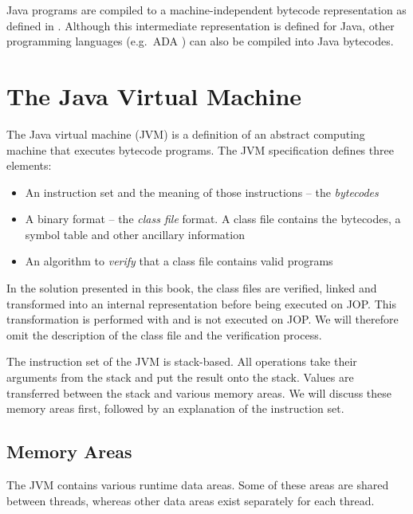 Java programs are compiled to a machine-independent bytecode
representation as defined in \cite{jvm}. Although this intermediate
representation is defined for Java, other programming languages
(e.g.\ ADA \cite{269646}) can also be compiled into Java bytecodes.

\section{The Java Virtual Machine}

The Java virtual machine (JVM) is a definition of an abstract
computing machine that executes bytecode programs. The JVM
specification \cite{jvm} defines three elements:
\begin{itemize}
    \item An instruction set and the meaning of those instructions
    -- the \emph{bytecodes}
    \item A binary format -- the \emph{class file} format. A
    class file contains the bytecodes, a symbol table and other
    ancillary information
    \item An algorithm to \emph{verify} that a class file
    contains valid programs
\end{itemize}
%
In the solution presented in this book, the class files are
verified, linked and transformed into an internal representation
before being executed on JOP. This transformation is performed with
 and is not executed on JOP. We will therefore omit the
description of the class file and the verification process.

The instruction set of the JVM is stack-based. All operations take
their arguments from the stack and put the result onto the stack.
Values are transferred between the stack and various memory areas.
We will discuss these memory areas first, followed by an explanation
of the instruction set.

\subsection{Memory Areas}

The JVM contains various runtime data areas. Some of these areas are
shared between threads, whereas other data areas exist separately
for each thread.

